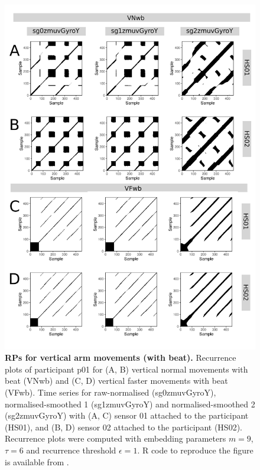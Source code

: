 \begin{figure}[!h]
\centering
\includegraphics[height=0.8\textheight]{rps_Vwb_w500}
\caption{
	{\bf RPs for vertical arm movements (with beat).}	
	Recurrence plots of participant p01 for 
	(A, B) vertical normal movements with beat (VNwb) and
	(C, D) vertical faster movements with beat (VFwb).
	Time series for raw-normalised (sg0zmuvGyroY), 
	normalised-smoothed 1 (sg1zmuvGyroY) and 
	normalised-smoothed 2 (sg2zmuvGyroY) with
	(A, C) sensor 01 attached to the participant (HS01), and
	(B, D) sensor 02 attached to the participant (HS02).
	Recurrence plots were computed with 
	embedding parameters $m=9$, $\tau=6$ and 
	recurrence threshold $\epsilon=1$.
	R code to reproduce the figure is available from \cite{hwum2018}.
        }
    \label{fig:rps_Vwb_w500}
\end{figure}


